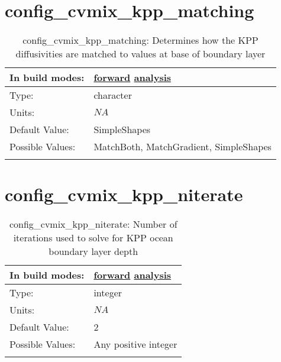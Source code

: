 \section[config\_cvmix\_kpp\_matching]{config\_cvmix\_kpp\_matching}
\label{sec:nm_sec_config_cvmix_kpp_matching}
\begin{center}
\begin{longtable}{| p{2.0in} || p{4.0in} |}
    \hline
    In build modes: & \hyperref[subsec:forward_nm_tab_cvmix]{forward} \hyperref[subsec:analysis_nm_tab_cvmix]{analysis} \\
    \hline
    Type: & character \\
    \hline
    Units: & $NA$ \\
    \hline
    Default Value: & SimpleShapes \\
    \hline
    Possible Values: & MatchBoth, MatchGradient, SimpleShapes \\
    \hline
    \caption{config\_cvmix\_kpp\_matching: Determines how the KPP diffusivities are matched to values at base of boundary layer}
\end{longtable}
\end{center}
\section[config\_cvmix\_kpp\_niterate]{config\_cvmix\_kpp\_niterate}
\label{sec:nm_sec_config_cvmix_kpp_niterate}
\begin{center}
\begin{longtable}{| p{2.0in} || p{4.0in} |}
    \hline
    In build modes: & \hyperref[subsec:forward_nm_tab_cvmix]{forward} \hyperref[subsec:analysis_nm_tab_cvmix]{analysis} \\
    \hline
    Type: & integer \\
    \hline
    Units: & $NA$ \\
    \hline
    Default Value: & 2 \\
    \hline
    Possible Values: & Any positive integer \\
    \hline
    \caption{config\_cvmix\_kpp\_niterate: Number of iterations used to solve for KPP ocean boundary layer depth}
\end{longtable}
\end{center}
